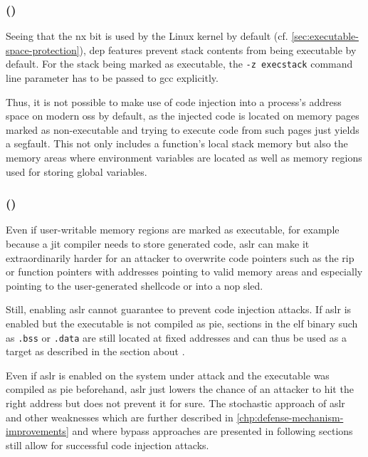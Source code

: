 \subsubsection{ ()}
\label{subsubsec:ci-data-execution-prevention}

Seeing that the \gls{nx} bit is used by the Linux kernel by default (cf. \cref{sec:executable-space-protection}), \gls{dep} features prevent stack contents from being executable by default.
For the stack being marked as executable, the \texttt{-z execstack} command line parameter has to be passed to \gls{gcc} explicitly.

Thus, it is not possible to make use of code injection into a process's address space on modern \glspl{os} by default, as the injected code is located on memory pages marked as non-executable and trying to execute code from such pages just yields a \gls{segfault}.
This not only includes a function's local stack memory but also the memory areas where environment variables are located as well as memory regions used for storing global variables.

\subsubsection{ ()}
\label{subsubsec:ci-aslr}

Even if user-writable memory regions are marked as executable, for example because a \gls{jit} compiler needs to store generated code, \gls{aslr} can make it extraordinarily harder for an attacker to overwrite code pointers such as the \gls{rip} or function pointers with addresses pointing to valid memory areas and especially pointing to the user-generated shellcode or into a \gls{nop} sled.

Still, enabling \gls{aslr} cannot guarantee to prevent code injection attacks.
If \gls{aslr} is enabled but the executable is not compiled as \gls{pie}, sections in the \gls{elf} binary such as \texttt{.bss} or \texttt{.data} are still located at fixed addresses and can thus be used as a target as described in the section about .

Even if \gls{aslr} is enabled on the system under attack and the executable was compiled as \gls{pie} beforehand, \gls{aslr} just lowers the chance of an attacker to hit the right address but does not prevent it for sure.
The stochastic approach of \gls{aslr} and other weaknesses which are further described in \cref{chp:defense-mechanism-improvements} and where bypass approaches are presented in following sections still allow for successful code injection attacks.

